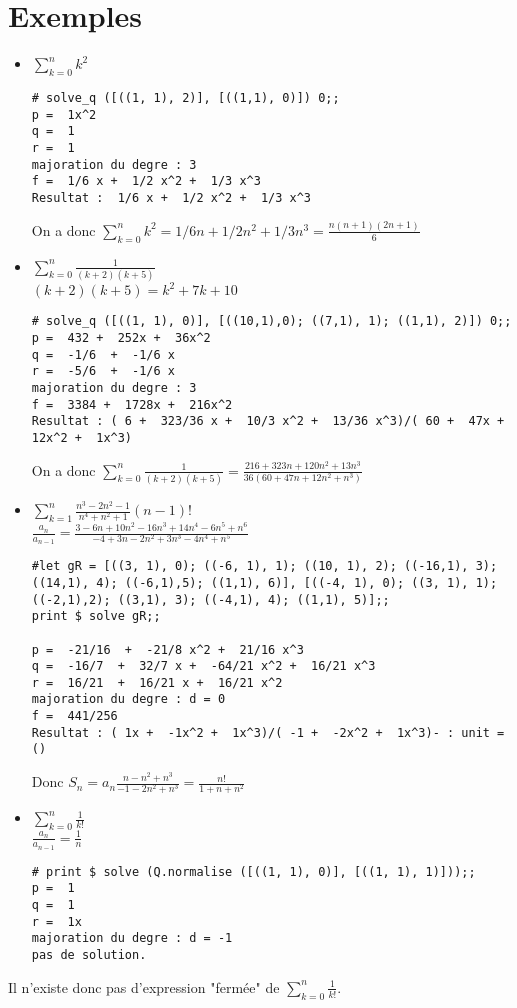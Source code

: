 \documentclass[17 pt,french]{scrartcl}
\begin{document}
  	\section*{Exemples}
  	 	\begin{itemize}
    		\item $\sum_{k=0}^n k^2$\\
    		\begin{lstlisting}
# solve_q ([((1, 1), 2)], [((1,1), 0)]) 0;;
p =  1x^2
q =  1
r =  1
majoration du degre : 3
f =  1/6 x +  1/2 x^2 +  1/3 x^3
Resultat :  1/6 x +  1/2 x^2 +  1/3 x^3
    		\end{lstlisting}
    		On a donc $\sum_{k=0}^n k^2 = 1/6 n +  1/2 n^2 +  1/3 n^3 = \frac{n(n+1)(2n+1)}{6}$
    		
    		\item $\sum_{k=0}^n \frac{1}{(k+2)(k+5)}$\\
    		$(k+2)(k+5) = k^2+7k+10$ 
    		\begin{lstlisting}
# solve_q ([((1, 1), 0)], [((10,1),0); ((7,1), 1); ((1,1), 2)]) 0;;
p =  432 +  252x +  36x^2
q =  -1/6  +  -1/6 x
r =  -5/6  +  -1/6 x
majoration du degre : 3
f =  3384 +  1728x +  216x^2
Resultat : ( 6 +  323/36 x +  10/3 x^2 +  13/36 x^3)/( 60 +  47x +  12x^2 +  1x^3)
    		\end{lstlisting}
    		On a donc $\sum_{k=0}^n \frac{1}{(k+2)(k+5)} = \frac{216+323 n+120 n^2+13 n^3}{36 \left(60+47 n+12 n^2+n^3\right)}$
    		
    	\newpage
    		\item $ \sum_{k=1}^n {\frac{n^3-2n^2-1}{n^4+n^2+1}(n-1)!}$ \\
    		$\frac{a_n}{a_{n-1}} = \frac{3-6 n+10 n^2-16 n^3+14 n^4-6 n^5+n^6}{-4+3 n-2 n^2+3 n^3-4 n^4+n^5} $ \\
    		\begin{lstlisting}
#let gR = [((3, 1), 0); ((-6, 1), 1); ((10, 1), 2); ((-16,1), 3); ((14,1), 4); ((-6,1),5); ((1,1), 6)], [((-4, 1), 0); ((3, 1), 1); ((-2,1),2); ((3,1), 3); ((-4,1), 4); ((1,1), 5)];;
print $ solve gR;;
    		
p =  -21/16  +  -21/8 x^2 +  21/16 x^3
q =  -16/7  +  32/7 x +  -64/21 x^2 +  16/21 x^3
r =  16/21  +  16/21 x +  16/21 x^2
majoration du degre : d = 0
f =  441/256 
Resultat : ( 1x +  -1x^2 +  1x^3)/( -1 +  -2x^2 +  1x^3)- : unit = ()
    		\end{lstlisting}
    		Donc $S_n = a_n\frac{n - n^2 + n^3}{-1 - 2 n^2 + n^3} = \frac{n!}{1+n+n^2}$
    		
    		\item $\sum_{k=0}^n \frac{1}{k!}$\\
    		$\frac{a_n}{a_{n-1}} = \frac{1}{n}$\\
    		\begin{lstlisting}
# print $ solve (Q.normalise ([((1, 1), 0)], [((1, 1), 1)]));;
p =  1
q =  1
r =  1x
majoration du degre : d = -1
pas de solution.
    		\end{lstlisting}   		
    		\end{itemize}
	Il n'existe donc pas d'expression "fermée" de $\sum_{k=0}^n \frac{1}{k!}$.
\end{document}

